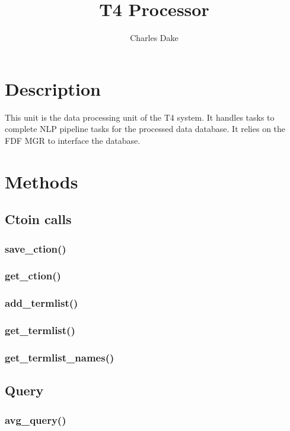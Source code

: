 \documentclass{article}
\title{T4 Processor}
\author{Charles Dake}
\begin{document}
\maketitle
\section{Description}
This unit is the data processing unit of the T4 system. It handles tasks to complete NLP pipeline tasks for the processed data database. It relies on the FDF MGR to interface the database.


\section{Methods}

\subsection{Ctoin calls}

\subsubsection{save_ction()}

\subsubsection{get_ction()}


\subsubsection{add_termlist()}

\subsubsection{get_termlist()}

\subsubsection{get_termlist_names()}

\subsection{Query}

\subsubsection{avg_query()}
\end{document}
